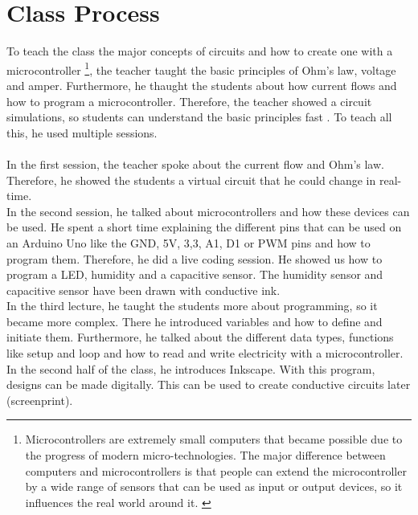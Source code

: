 \documentclass[00_doc.tex]{subfiles}
\begin{document}
    \section{Class Process}
    \begin{flushleft}
        To teach the class the major concepts of circuits and how to create one with a 
        microcontroller {\footnote{\label{foot: microcontroller} Microcontrollers are extremely 
        small computers that became possible due to the progress of modern micro-technologies. 
        The major difference between computers and microcontrollers is that people can extend the 
        microcontroller by a wide range of sensors that can be used as input or output devices, 
        so it influences the real world around it. \cite{Schief1997, Dembowski2014}}}, the teacher 
        taught the basic principles of Ohm's law, voltage and amper. Furthermore, he thaught the 
        students about how current flows and how to program a microcontroller. Therefore, the teacher 
        showed a circuit simulations, so students can understand the basic principles fast 
        \cite{Wegener2020}. To teach all this, he used multiple sessions.\\~\\

        In the first session, the teacher spoke about the current flow and Ohm's law. Therefore, he 
        showed the students a virtual circuit that he could change in real-time.\cite{Wegener2020}\\

        In the second session, he talked about microcontrollers and how these devices can be used. 
        He spent a short time explaining the different pins that can be used on an Arduino Uno \cite{arduinoUno}
        like the GND, 5V, 3,3, A1, D1 or PWM pins and how to program them. Therefore, he did a 
        live coding session. He showed us how to program a LED, humidity and a capacitive sensor. 
        The humidity sensor and capacitive sensor have been drawn with conductive ink.\\

        In the third lecture, he taught the students more about programming, so it became more 
        complex. There he introduced variables and how to define and initiate them. Furthermore, he 
        talked about the different data types, functions like setup and loop and how to read and 
        write electricity with a microcontroller. In the second half of the class, he introduces 
        Inkscape\cite{inkscape}. With this program, designs can be made digitally. This can be used
        to create conductive circuits later (screenprint).\\


\end{flushleft}
\end{document}
